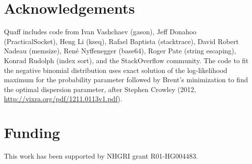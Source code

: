 \documentclass{bioinfo}
\begin{document}
\section*{Acknowledgements}

Quaff includes code from Ivan Vashchaev (gason), Jeff Donahoo (PracticalSocket), Heng Li (kseq), Rafael Baptista (stacktrace), David Robert Nadeau (memsize), Ren\'{e} Nyffenegger (base64), Roger Pate (string escaping), Konrad Rudolph (index sort), and the StackOverflow community. The code to fit the negative binomial distribution uses exact solution of the log-likelihood maximum for the probability parameter followed by Brent's minimization to find the optimal dispersion parameter, after Stephen Crowley (2012, \url{http://vixra.org/pdf/1211.0113v1.pdf}).

\section*{Funding}

This work has been supported by NHGRI grant R01-HG004483.


%
%
%
%
%
%
%
%



\end{document}
